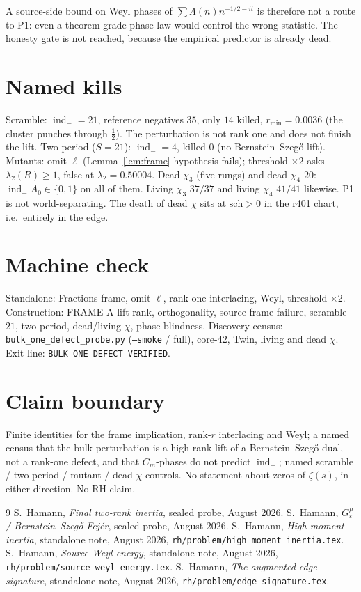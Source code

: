 \documentclass[11pt]{article}
\theoremstyle{remark}
\newcommand{\indm}{\operatorname{ind}_{-}}
\newcommand{\half}{\tfrac12}
\begin{document}
A source-side bound on Weyl phases of
$\sum\Lambda(n)n^{-1/2-it}$ is therefore not a route to P1:
even a theorem-grade phase law would control the wrong
statistic.
The honesty gate is not reached, because the empirical
predictor is already dead.

\section{Named kills}\label{sec:kills}

Scramble: $\indm=21$, reference negatives $35$, only $14$
killed, $r_{\min}=0.0036$ (the cluster punches through
$\half$).  The perturbation is not rank one and does not
finish the lift.
Two-period ($S=21$): $\indm=4$, killed $0$ (no
Bernstein--Szeg\H{o} lift).
Mutants: omit $\ell$ (Lemma~\ref{lem:frame} hypothesis
fails); threshold $\times 2$ asks $\lambda_2(R)\ge 1$, false
at $\lambda_2=0.50004$.
Dead $\chi_3$ (five rungs) and dead $\chi_4$-$20$:
$\indm A_0\in\{0,1\}$ on all of them.
Living $\chi_3$ $37/37$ and living $\chi_4$ $41/41$ likewise.
P1 is not world-separating.
The death of dead $\chi$ sits at $\mathrm{sch}>0$ in the
r401 chart, i.e.\ entirely in the edge.

\section*{Machine check}

Standalone: Fractions frame, omit-$\ell$, rank-one
interlacing, Weyl, threshold $\times 2$.
Construction: FRAME-A lift rank, orthogonality, source-frame
failure, scramble $21$, two-period, dead/living $\chi$,
phase-blindness.
Discovery census: \texttt{bulk\_one\_defect\_probe.py}
(\texttt{--smoke} / full), core-$42$, Twin, living and dead
$\chi$.
Exit line: \texttt{BULK ONE DEFECT VERIFIED}.

\section*{Claim boundary}

Finite identities for the frame implication, rank-$r$
interlacing and Weyl; a named census that the bulk
perturbation is a high-rank lift of a Bernstein--Szeg\H{o}
dual, not a rank-one defect, and that $C_m$-phases do not
predict $\indm$; named scramble / two-period / mutant /
dead-$\chi$ controls.
No statement about zeros of $\zeta(s)$, in either direction.
No RH claim.

\begin{thebibliography}{9}
S.~Hamann,
\textit{Final two-rank inertia},
sealed probe, August 2026.
S.~Hamann,
\textit{$G_\varepsilon^\mu$ / Bernstein--Szeg\H{o} Fej\'er},
sealed probe, August 2026.
S.~Hamann,
\textit{High-moment inertia},
standalone note, August 2026,
\texttt{rh/problem/high\_moment\_inertia.tex}.
S.~Hamann,
\textit{Source Weyl energy},
standalone note, August 2026,
\texttt{rh/problem/source\_weyl\_energy.tex}.
S.~Hamann,
\textit{The augmented edge signature},
standalone note, August 2026,
\texttt{rh/problem/edge\_signature.tex}.
\end{thebibliography}
\end{document}
